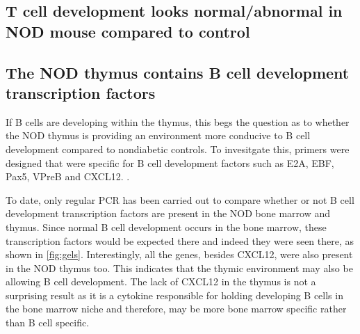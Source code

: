 

\subsection{T cell development looks normal/abnormal in NOD mouse compared to control}


\subsection{The NOD thymus contains B cell development transcription factors}

If B cells are developing within the thymus, this begs the question as to whether the NOD thymus is providing an environment more conducive to B cell development compared to nondiabetic controls. 
To invesitgate this, primers were designed that were specific for B cell development factors such as E2A, EBF, Pax5, VPreB and CXCL12.
.

To date, only regular PCR has been carried out to compare whether or not B cell development transcription factors are present in the NOD bone marrow and thymus.
Since normal B cell development occurs in the bone marrow, these transcription factors would be expected there and indeed they were seen there, as shown in \cref{fig:gels}. 
Interestingly, all the genes, besides CXCL12, were also present in the NOD thymus too.
This indicates that the thymic environment may also be allowing B cell development.
The lack of CXCL12 in the thymus is not a surprising result as it is a cytokine responsible for holding developing B cells in the bone marrow niche and therefore, may be more bone marrow specific rather than B cell specific.

